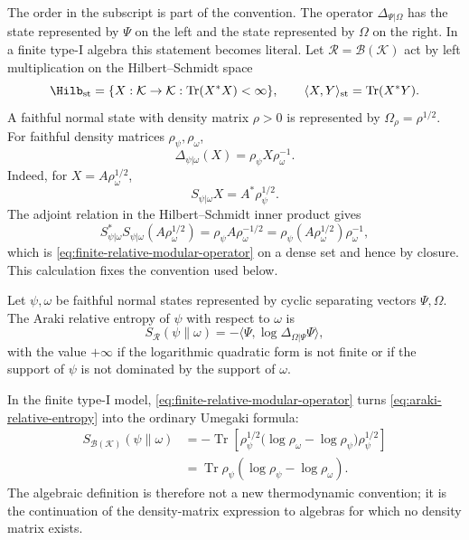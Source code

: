 The order in the subscript is part of the convention.  The operator
\(\Delta_{\Psi|\Omega}\) has the state represented by \(\Psi\) on the left
and the state represented by \(\Omega\) on the right.  In a finite type-I
algebra this statement becomes literal.  Let
\(\mathcal R=\mathcal B(\mathcal K)\) act by left multiplication on the
Hilbert--Schmidt space
\[
  \Hilb_{\rm st}=\{X:\mathcal K\to\mathcal K:
  \operatorname{Tr}(X^*X)<\infty\},
  \qquad
  \langle X,Y\rangle_{\rm st}=\operatorname{Tr}(X^*Y).
\]
A faithful normal state with density matrix \(\rho>0\) is represented by
\(\Omega_\rho=\rho^{1/2}\).  For faithful density matrices
\(\rho_\psi,\rho_\omega\),
\begin{equation}
  \Delta_{\psi|\omega}(X)
  =
  \rho_\psi X\rho_\omega^{-1}.
  \label{eq:finite-relative-modular-operator}
\end{equation}
Indeed, for \(X=A\rho_\omega^{1/2}\),
\[
  S_{\psi|\omega}X=A^*\rho_\psi^{1/2}.
\]
The adjoint relation in the Hilbert--Schmidt inner product gives
\[
  S_{\psi|\omega}^*S_{\psi|\omega}
  (A\rho_\omega^{1/2})
  =
  \rho_\psi A\rho_\omega^{-1/2}
  =
  \rho_\psi(A\rho_\omega^{1/2})\rho_\omega^{-1},
\]
which is \eqref{eq:finite-relative-modular-operator} on a dense set and hence
by closure.  This calculation fixes the convention used below.

\begin{definition}
\label{def:araki-relative-entropy}
Let \(\psi,\omega\) be faithful normal states represented by cyclic separating
vectors \(\Psi,\Omega\).  The Araki relative entropy of \(\psi\) with respect
to \(\omega\) is
\begin{equation}
  S_{\mathcal R}(\psi\|\omega)
  =
  -\langle\Psi,\log\Delta_{\Omega|\Psi}\Psi\rangle,
  \label{eq:araki-relative-entropy}
\end{equation}
with the value \(+\infty\) if the logarithmic quadratic form is not finite or
if the support of \(\psi\) is not dominated by the support of \(\omega\).
\end{definition}

In the finite type-I model, \eqref{eq:finite-relative-modular-operator}
turns \eqref{eq:araki-relative-entropy} into the ordinary Umegaki formula:
\[
\begin{aligned}
  S_{\mathcal B(\mathcal K)}(\psi\|\omega)
  &=
  -\operatorname{Tr}\!\left[
    \rho_\psi^{1/2}
    \bigl(\log\rho_\omega-\log\rho_\psi\bigr)
    \rho_\psi^{1/2}
  \right]  \\
  &=
  \operatorname{Tr}\rho_\psi(\log\rho_\psi-\log\rho_\omega).
\end{aligned}
\]
The algebraic definition is therefore not a new thermodynamic convention; it
is the continuation of the density-matrix expression to algebras for which no
density matrix exists.

